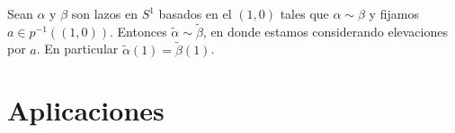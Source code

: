 \documentclass[GTSResumen.tex]{subfiles}
\begin{document}

\begin{coro}
Sean $\alpha$ y $\beta$ son lazos en $S^1$ basados en el $(1,0)$ tales que $\alpha\sim \beta$ y fijamos $a\in p^{-1}((1,0))$. Entonces $\tilde{\alpha}\sim\tilde{\beta}$, en donde estamos considerando elevaciones por $a$. En particular $\tilde{\alpha}(1)=\tilde{\beta}(1)$.
\end{coro}
\begin{comment}
\begin{dem}
Si $\alpha\sim\beta$ mediante una homotopía $F$, por la propiedad de levantamiento de homotopía se tiene que $\tilde{\alpha}\sim\tilde{\beta}$ mediante $\widetilde{F}$. Nótese que efectivamente esta última homotopía es relativa a $\{0,1\}$, como vamos a probar. Por la definición del levantamiento de la homotopía tenemos que $\widetilde{H}(t,0)=\tilde{\alpha}(t)$ y $\widetilde{H}(t,1)=\tilde{\beta}(t)$. Como ambas elevaciones se dan por $a$, se tiene que $\widetilde{F}(0,0)=\tilde{\alpha}(0)=\tilde{\beta}(0)=a$. Además, $\tilde{F}(1,s)$ es un camino entre $\tilde{\alpha}(1)$ y $\tilde{\beta}(1)$. Por otro lado, $F(1,s)=(1,0)$, luego $\widetilde{F}(1,s)\in p^{-1}((1,0))$, que tiene la topología discreta, por lo que $\widetilde{F}(1,s)$ es constante, de lo que se deduce que $\widetilde{F}(1,s)=\tilde{\alpha}(1)=\tilde{\beta}(1)$. El mismo razonamiento es válido para $\widetilde{F}(0,s)$. 
\end{dem}
\end{comment}
\section{Aplicaciones}
\end{document}

